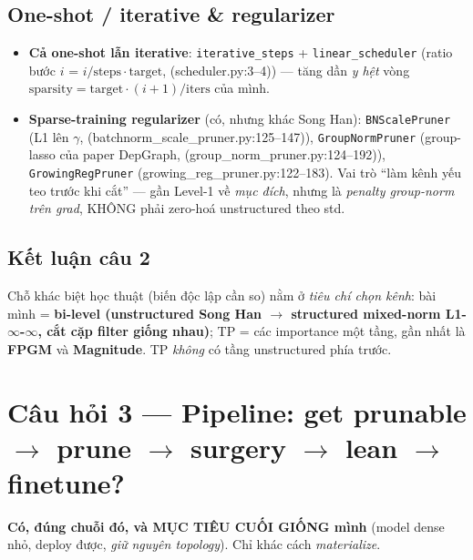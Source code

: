 \documentclass[11pt,a4paper]{article}
\newcommand{\code}[1]{\texttt{#1}}
\newcommand{\src}[1]{{\small\ttfamily(#1)}}   %
\begin{document}
\subsection{One-shot / iterative \& regularizer}
\begin{itemize}
  \item \textbf{Cả one-shot lẫn iterative}: \code{iterative\_steps} + \code{linear\_scheduler}
        (ratio bước \(i\) = \(i/\text{steps}\cdot\text{target}\), \src{scheduler.py:3--4}) --- tăng dần
        \emph{y hệt} vòng \(\text{sparsity}=\text{target}\cdot(i{+}1)/\text{iters}\) của mình.
  \item \textbf{Sparse-training regularizer} (có, nhưng khác Song Han): \code{BNScalePruner} (L1 lên
        \(\gamma\), \src{batchnorm\_scale\_pruner.py:125--147}), \code{GroupNormPruner} (group-lasso
        của paper DepGraph, \src{group\_norm\_pruner.py:124--192}), \code{GrowingRegPruner}
        \src{growing\_reg\_pruner.py:122--183}. Vai trò ``làm kênh yếu teo trước khi cắt'' --- gần
        Level-1 về \emph{mục đích}, nhưng là \emph{penalty group-norm trên grad}, KHÔNG phải zero-hoá
        unstructured theo std.
\end{itemize}

\subsection{Kết luận câu 2}
Chỗ khác biệt học thuật (biến độc lập cần so) nằm ở \emph{tiêu chí chọn kênh}:
bài mình = \textbf{bi-level (unstructured Song Han \(\rightarrow\) structured mixed-norm
L1-\(\infty\)-\(\infty\), cắt cặp filter giống nhau)}; TP = các importance một tầng, gần nhất là
\textbf{FPGM} và \textbf{Magnitude}. TP \emph{không} có tầng unstructured phía trước.

\section{Câu hỏi 3 --- Pipeline: get prunable \(\rightarrow\) prune \(\rightarrow\) surgery
\(\rightarrow\) lean \(\rightarrow\) finetune?}

\noindent\textbf{Có, đúng chuỗi đó, và MỤC TIÊU CUỐI GIỐNG mình} (model dense nhỏ, deploy được,
\emph{giữ nguyên topology}). Chỉ khác cách \emph{materialize}.
\end{document}
